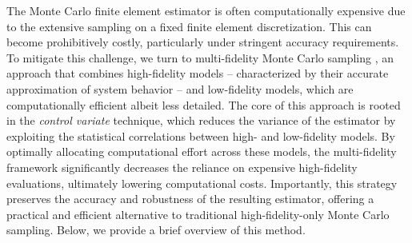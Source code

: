 \documentclass[final,3p,times,11pt]{elsarticle}
\begin{document}
The Monte Carlo finite element estimator is often computationally expensive due to the extensive sampling on a fixed finite element discretization. This can become prohibitively costly, particularly under stringent accuracy requirements. To mitigate this challenge, we turn to multi-fidelity Monte Carlo sampling \cite{PeWiGu:2016}, an approach that combines high-fidelity models -- characterized by their accurate approximation of system behavior -- and low-fidelity models, which are computationally efficient albeit less detailed. The core of this approach is rooted in the {\it control variate} technique, which reduces the variance of the estimator by exploiting the statistical correlations between high- and low-fidelity models. By optimally allocating computational effort across these models, the multi-fidelity framework significantly decreases the reliance on expensive high-fidelity evaluations, ultimately lowering computational costs. Importantly, this strategy preserves the accuracy and robustness of the resulting estimator, offering a practical and efficient alternative to traditional high-fidelity-only Monte Carlo sampling. Below, we provide a brief overview of this method.
\end{document}
